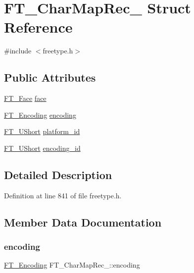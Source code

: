 \hypertarget{struct_f_t___char_map_rec__}{}\section{F\+T\+\_\+\+Char\+Map\+Rec\+\_\+ Struct Reference}
\label{struct_f_t___char_map_rec__}


{\ttfamily \#include $<$freetype.\+h$>$}

\subsection*{Public Attributes}
\begin{DoxyCompactItemize}
\item 
\mbox{\hyperlink{freetype_8h_a7eba045ee20968354fa1bff0f69740fa}{F\+T\+\_\+\+Face}} \mbox{\hyperlink{struct_f_t___char_map_rec___a70a4e53e3f9818209916e5745c46dc28}{face}}
\item 
\mbox{\hyperlink{freetype_8h_a2c7f8d9834bb770d792cd8e0079f6835}{F\+T\+\_\+\+Encoding}} \mbox{\hyperlink{struct_f_t___char_map_rec___a88ee6f726ef11a8e6cc793d59ff5557e}{encoding}}
\item 
\mbox{\hyperlink{fttypes_8h_a937f6c17cf5ffd09086d8610c37b9f58}{F\+T\+\_\+\+U\+Short}} \mbox{\hyperlink{struct_f_t___char_map_rec___ae7f439996a8615698e780ce3c4f92457}{platform\+\_\+id}}
\item 
\mbox{\hyperlink{fttypes_8h_a937f6c17cf5ffd09086d8610c37b9f58}{F\+T\+\_\+\+U\+Short}} \mbox{\hyperlink{struct_f_t___char_map_rec___af10dd43eee8dc93e7d6191c663ae831a}{encoding\+\_\+id}}
\end{DoxyCompactItemize}


\subsection{Detailed Description}


Definition at line 841 of file freetype.\+h.



\subsection{Member Data Documentation}
\mbox{\label{struct_f_t___char_map_rec___a88ee6f726ef11a8e6cc793d59ff5557e}} 
\subsubsection{\texorpdfstring{encoding}{encoding}}
{\footnotesize\ttfamily \mbox{\hyperlink{freetype_8h_a2c7f8d9834bb770d792cd8e0079f6835}{F\+T\+\_\+\+Encoding}} F\+T\+\_\+\+Char\+Map\+Rec\+\_\+\+::encoding}



